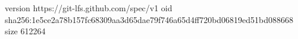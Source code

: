 version https://git-lfs.github.com/spec/v1
oid sha256:1e5ce2a78b157fc68309aa3d65dae79f746a65d4ff720bd06819ed51bd088668
size 612264
